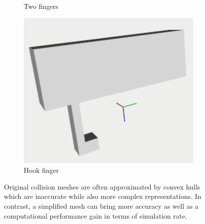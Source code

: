 \begin{figure}[t]
\begin{subfigure}{0.3\columnwidth}
    \caption{Two fingers}\label{fig:two_fingers}
\end{subfigure}%
\hfill
\begin{subfigure}{0.3\columnwidth}
    \includegraphics[width=\linewidth]{framework_manipulation/figures/hardware/single_hook_cropped.pdf}
    \caption{Hook finger}\label{fig:hook_finger}
\end{subfigure}

\caption{Original collision meshes are often approximated by convex hulls which are inaccurate while also more complex representations. In contrast, a simplified mesh can bring more accuracy as well as a computational performance gain in terms of simulation rate.}\label{fig:1}

\end{figure}

